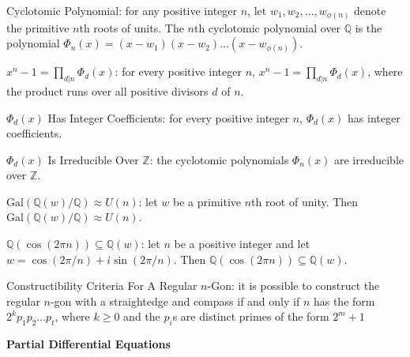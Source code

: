 Cyclotomic Polynomial: for any positive integer $n$, let $w_1,w_2,\dots,w_{\phi (n)}$ denote the primitive $n$th roots of units. The $n$th cyclotomic polynomial over $\mathbb{Q}$ is the polynomial $\Phi_n (x)=(x-w_1)(x-w_2)\dots (x-w_{\phi (n)})$.

$x^n-1=\prod_{d|n} \Phi_d (x)$: for every positive integer $n$, $x^n-1=\prod_{d|n} \Phi_d (x)$, where the product runs over all positive divisors $d$ of $n$.

$\Phi_d (x)$ Has Integer Coefficients: for every positive integer $n$, $\Phi_d (x)$ has integer coefficients.

$\Phi_d (x)$ Is Irreducible Over $\mathbb{Z}$: the cyclotomic polynomials $\Phi_n (x)$ are irreducible over $\mathbb{Z}$.

$\text{Gal}(\mathbb{Q}(w)/\mathbb{Q}) \approx U(n)$: let $w$ be a primitive $n$th root of unity. Then $\text{Gal}(\mathbb{Q}(w)/\mathbb{Q}) \approx U(n)$.

$\mathbb{Q}(\cos(2 \pi n)) \subseteq \mathbb{Q}(w)$: let $n$ be a positive integer and let $w=\cos(2\pi /n) + i\sin(2\pi /n)$. Then $\mathbb{Q}(\cos(2 \pi n)) \subseteq \mathbb{Q}(w)$.

Constructibility Criteria For A Regular $n$-Gon: it is possible to construct the regular $n$-gon with a straightedge and compass if and only if $n$ has the form $2^k p_1p_2\dots p_t$, where $k \ge 0$ and the $p_i$s are distinct primes of the form $2^m+1$

\newpage

\textbf{Partial Differential Equations}

